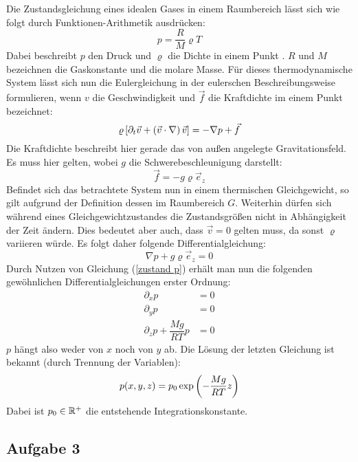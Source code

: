 			Die Zustandsgleichung eines idealen Gases in einem Raumbereich  lässt sich wie folgt durch Funktionen-Arithmetik ausdrücken:
			\begin{equation}
				\label{zustand p}
				p = \dfrac{R}{M}\varrho T
			\end{equation}
			Dabei beschreibt $p$ den Druck und $\varrho$ die Dichte in einem Punkt .
			$R$ und $M$ bezeichnen die Gaskonstante und die molare Masse.
			Für dieses thermodynamische System lässt sich nun die Eulergleichung in der eulerschen Beschreibungsweise formulieren, wenn $v$ die Geschwindigkeit und $\vec{f}$ die Kraftdichte im einem Punkt  bezeichnet:
			\begin{equation}
				\label{eulergleichung}
				\varrho \left[  \partial_t \vec{v} + \left(  \vec{v}\cdot\nabla  \right)\vec{v}  \right] = -\nabla p + \vec{f}
			\end{equation}
			Die Kraftdichte beschreibt hier gerade das von außen angelegte Gravitationsfeld.
			Es muss hier gelten, wobei $g$ die Schwerebeschleunigung darstellt:
			\begin{equation}
				\label{kraftdichte}
				\vec{f} = -g\varrho\vec{e}_z
			\end{equation}
			Befindet sich das betrachtete System nun in einem thermischen Gleichgewicht, so gilt aufgrund der Definition dessen  im Raumbereich $G$.
			Weiterhin dürfen sich während eines Gleichgewichtzustandes die Zustandsgrößen nicht in Abhängigkeit der Zeit ändern.
			Dies bedeutet aber auch, dass $\vec{v}=0$ gelten muss, da sonst $\varrho$ variieren würde.
			Es folgt daher folgende Differentialgleichung:
			\begin{equation}
				\label{dgl}
				\nabla p + g\varrho\vec{e}_z = 0
			\end{equation}
			Durch Nutzen von Gleichung (\ref{zustand p}) erhält man nun die folgenden gewöhnlichen Differentialgleichungen erster Ordnung:
			\begin{align}
				\partial_x p &= 0 \\
				\partial_y p &= 0 \\
				\partial_z p + \dfrac{Mg}{RT}p &= 0
			\end{align}
			$p$ hängt also weder von $x$ noch von $y$ ab.
			Die Lösung der letzten Gleichung ist bekannt (durch Trennung der Variablen):
			\begin{equation}
				p(x,y,z) = p_0\exp\left(  -\dfrac{Mg}{RT}z  \right)
			\end{equation}
			Dabei ist $p_0\in\mathbb{R}^+$ die entstehende Integrationskonstante.


		\newpage

		\subsection*{Aufgabe 3} %
		\label{sub:aufgabe_3}
		
			



